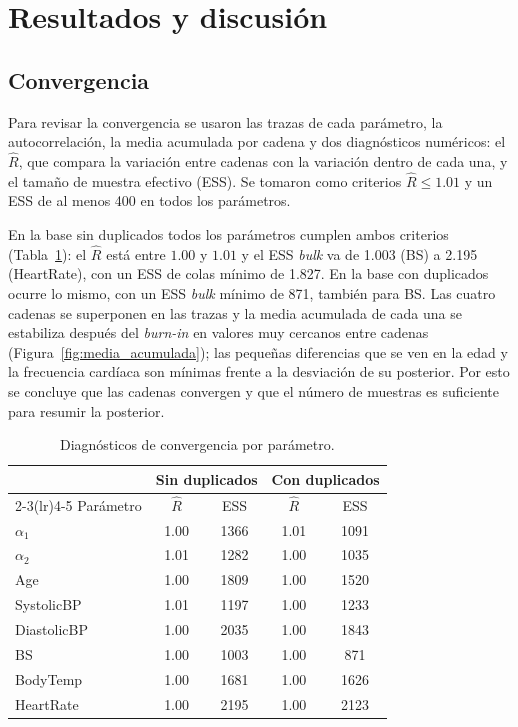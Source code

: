 % 
\section{Resultados y discusión}
\subsection{Convergencia}
Para revisar la convergencia se usaron las trazas de cada parámetro, la
autocorrelación, la media acumulada por cadena y dos diagnósticos numéricos: el
$\hat{R}$, que compara la variación entre cadenas con la variación dentro de
cada una, y el tamaño de muestra efectivo (ESS). Se tomaron como criterios
$\hat{R}\leq1.01$ y un ESS de al menos 400 en todos los parámetros.

En la base sin duplicados todos los parámetros cumplen ambos criterios
(Tabla~\ref{tab:convergencia}): el $\hat{R}$ está entre $1.00$ y $1.01$ y el ESS
\emph{bulk} va de 1.003 (BS) a 2.195 (HeartRate), con un ESS de colas mínimo de
1.827. En la base con duplicados ocurre lo mismo, con un ESS \emph{bulk} mínimo
de 871, también para BS. Las cuatro cadenas se superponen en las trazas y la
media acumulada de cada una se estabiliza después del \emph{burn-in} en valores
muy cercanos entre cadenas (Figura~\ref{fig:media_acumulada}); las pequeñas
diferencias que se ven en la edad y la frecuencia cardíaca son mínimas frente a
la desviación de su posterior. Por esto se concluye que las cadenas convergen y
que el número de muestras es suficiente para resumir la posterior.

\begin{table}[h]
\centering
\caption{Diagnósticos de convergencia por parámetro.}
\label{tab:convergencia}
\small
\begin{tabular}{lcccc}
\toprule
 & \multicolumn{2}{c}{Sin duplicados} & \multicolumn{2}{c}{Con duplicados}\\
\cmidrule(lr){2-3}\cmidrule(lr){4-5}
Parámetro & $\hat{R}$ & ESS & $\hat{R}$ & ESS\\
\midrule
$\alpha_1$  & 1.00 & 1366 & 1.01 & 1091\\
$\alpha_2$  & 1.01 & 1282 & 1.00 & 1035\\
Age         & 1.00 & 1809 & 1.00 & 1520\\
SystolicBP  & 1.01 & 1197 & 1.00 & 1233\\
DiastolicBP & 1.00 & 2035 & 1.00 & 1843\\
BS          & 1.00 & 1003 & 1.00 & 871\\
BodyTemp    & 1.00 & 1681 & 1.00 & 1626\\
HeartRate   & 1.00 & 2195 & 1.00 & 2123\\
\bottomrule
\end{tabular}
\end{table}

